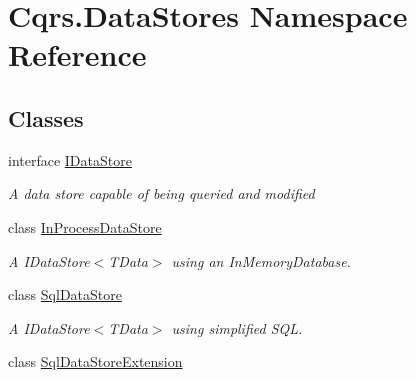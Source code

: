 \hypertarget{namespaceCqrs_1_1DataStores}{}\section{Cqrs.\+Data\+Stores Namespace Reference}
\label{namespaceCqrs_1_1DataStores}
\subsection*{Classes}
\begin{DoxyCompactItemize}
\item 
interface \hyperlink{interfaceCqrs_1_1DataStores_1_1IDataStore}{I\+Data\+Store}
\begin{DoxyCompactList}\small\item\em A data store capable of being queried and modified \end{DoxyCompactList}\item 
class \hyperlink{classCqrs_1_1DataStores_1_1InProcessDataStore}{In\+Process\+Data\+Store}
\begin{DoxyCompactList}\small\item\em A I\+Data\+Store$<$\+T\+Data$>$ using an In\+Memory\+Database. \end{DoxyCompactList}\item 
class \hyperlink{classCqrs_1_1DataStores_1_1SqlDataStore}{Sql\+Data\+Store}
\begin{DoxyCompactList}\small\item\em A I\+Data\+Store$<$\+T\+Data$>$ using simplified S\+QL. \end{DoxyCompactList}\item 
class \hyperlink{classCqrs_1_1DataStores_1_1SqlDataStoreExtension}{Sql\+Data\+Store\+Extension}
\end{DoxyCompactItemize}
